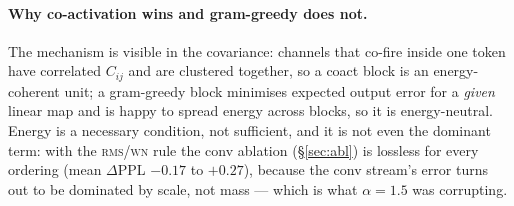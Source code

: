 \documentclass[11pt]{article}
\newcommand{\rms}{\textsc{rms}}
\newcommand{\wn}{\textsc{wn}}
\begin{document}
\paragraph{Why co-activation wins and gram-greedy does not.} The mechanism is visible in
the covariance: channels that co-fire inside one token have correlated \(C_{ij}\) and are
clustered together, so a coact block is an energy-coherent unit; a gram-greedy block
minimises expected output error for a \emph{given} linear map and is happy to spread
energy across blocks, so it is energy-neutral. Energy is a necessary condition, not
sufficient, and it is not even the dominant term: with the \rms/\wn{} rule the conv
ablation (\S\ref{sec:abl}) is lossless for every ordering (mean $\Delta$PPL $-0.17$ to
$+0.27$), because the conv stream's error turns out to be dominated by scale, not mass ---
which is what $\alpha{=}1.5$ was corrupting.
\end{document}

